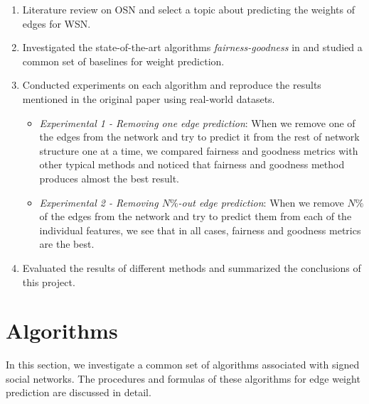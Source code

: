 \documentclass{article}
\begin{document}
\begin{enumerate}
	\item Literature review on OSN and select a topic about predicting the weights of edges for WSN.
	
	\item Investigated the state-of-the-art algorithms \emph{fairness-goodness} in\cite{kumar2016edge} and  studied a common set of baselines for weight prediction.
	
	\item Conducted experiments on each algorithm and reproduce the results mentioned in the original paper using real-world datasets.
  
  \begin{itemize}
    \item \emph{Experimental 1 -   Removing one edge prediction}: 
    When we remove one of the edges from the network and try to 
    predict it from the rest of network structure one at a time, 
    we compared fairness and goodness metrics with other typical 
    methods and noticed that fairness and goodness method produces 
    almost the best result. 
	
    \item \emph{Experimental 2 -  Removing $N \%$-out edge prediction}: 
    When we remove $N\%$ of the edges from the network and try to 
    predict them from each of the individual features, we see 
    that in all cases, fairness and goodness metrics are the best.
  \end{itemize}
  
  \item  Evaluated the results of different methods and summarized the conclusions of this project.
	
\end{enumerate}

\section{Algorithms}
\label{sec4}
In this section, we investigate a common set of algorithms
associated with signed social networks. The procedures and
formulas of these algorithms for edge weight prediction are 
discussed in detail. 








\end{document}
